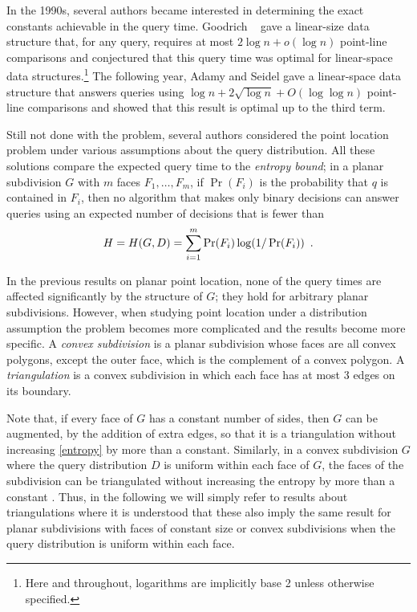 \documentclass[lotsofwhite]{patmorin}
\begin{document}
In the 1990s, several authors became interested in determining the
exact constants achievable in the query time.  Goodrich \etal\
\cite{gor97} gave a linear-size data structure that, for any query,
requires at most $2\log n + o(\log n)$ point-line comparisons and
conjectured that this query time was optimal for linear-space data
structures.\footnote{Here and throughout, logarithms are implicitly base 2
unless otherwise specified.} The following year, Adamy and Seidel
\cite{as98} gave a linear-space data structure that answers queries
using $\log n + 2\sqrt{\log n} + O(\log\log n)$ point-line comparisons
and showed that this result is optimal up to the third term.

Still not done with the problem, several authors considered the point
location problem under various assumptions about the query
distribution.  All these solutions compare the expected query time to
the \emph{entropy bound};  in a planar subdivision $G$ with $m$ faces
$F_1,\ldots,F_m$, if $\Pr(F_i)$ is the probability that $q$ is
contained in $F_i$, then no algorithm that makes only binary decisions
can answer queries using an expected number of decisions that is fewer
than 
\begin{equation}
    H = H(G,D) = \sum_{i=1}^m \Pr(F_i)\log(1/\Pr(F_i)) \enspace . 
	\eqlabel{entropy}
	\eqlabel{entropy-face}
\end{equation}

In the previous results on planar point location, none of the query
times are affected significantly by the structure of $G$;  they hold
for arbitrary planar subdivisions.  However, when studying point
location under a distribution assumption the problem becomes more
complicated and the results become more specific.  A \emph{convex
subdivision} is a planar subdivision whose faces are all convex
polygons, except the outer face, which is the complement of a convex
polygon.  A \emph{triangulation} is a convex subdivision in which each
face has at most 3 edges on its boundary.

Note that, if every face of $G$ has a constant number of sides, then
$G$ can be augmented, by the addition of extra edges, so that it is a
triangulation without increasing \eqref{entropy} by more than a
constant.  Similarly, in a convex subdivision $G$ where the query
distribution $D$ is uniform within each face of $G$, the faces of the
subdivision can be triangulated without increasing the entropy by more
than a constant \cite{amm00}. Thus, in the following we will simply
refer to results about triangulations where it is understood that
these also imply the same result for planar subdivisions with faces of
constant size or convex subdivisions when the query distribution is
uniform within each face.
\end{document}
